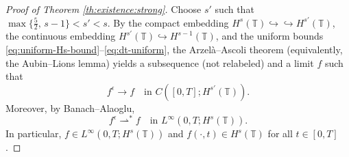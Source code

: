 \documentclass[reqno]{amsart}
\newcommand{\TT}{\mathbb T}
\theoremstyle{definition}
\numberwithin{equation}{section}
\numberwithin{theorem}{section}
\numberwithin{definition}{section}
\begin{document}
\begin{proof}[Proof of Theorem \ref{th:existence:strong}]
Choose $s'$ such that $\max\{\frac52,\,s-1\}<s'<s$. By the compact embedding $H^s(\TT)\hookrightarrow\hookrightarrow H^{s'}(\TT)$,
the continuous embedding $H^{s'}(\TT)\hookrightarrow H^{s-1}(\TT)$, and the uniform bounds
\eqref{eq:uniform-Hs-bound}--\eqref{eq:dt-uniform}, the Arzel\`a--Ascoli theorem (equivalently, the Aubin--Lions lemma) yields a subsequence
(not relabeled) and a limit $f$ such that
\begin{equation}\label{eq:strong-conv}
	f^\epsilon\to f \quad\text{in } C([0,T];H^{s'}(\TT)).
\end{equation}
Moreover, by Banach--Alaoglu,
\begin{equation}\label{eq:weakstar-conv}
	f^\epsilon \rightharpoonup^\ast f \quad\text{in } L^\infty(0,T;H^s(\TT)).
\end{equation}
In particular, $f\in L^\infty(0,T;H^s(\TT))$ and $f(\cdot,t)\in H^s(\TT)$ for all $t\in[0,T]$.


\end{proof}
\end{document}

